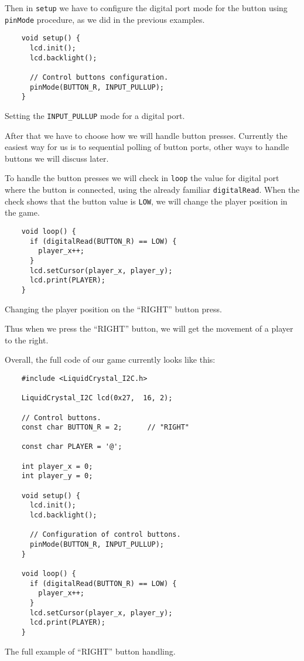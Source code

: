 \documentclass[../sparc.tex]{subfiles}
\begin{document}
Then in \texttt{setup} we have to configure the digital port mode for
the button using \texttt{pinMode} procedure, as we did in the previous
examples.

\begin{listing}[H]
  \begin{verbatim}
    void setup() {
      lcd.init();
      lcd.backlight();

      // Control buttons configuration.
      pinMode(BUTTON_R, INPUT_PULLUP);
    }
  \end{verbatim}
  \caption{Setting the \texttt{INPUT_PULLUP} mode for a digital port.}
  \label{listing:game-dev-input-pullup-mode}
\end{listing}

After that we have to choose how we will handle button presses.  Currently the
easiest way for us is to sequential polling of button ports, other ways to
handle buttons we will discuss later.

To handle the button presses we will check in \texttt{loop} the value
for digital port where the button is connected, using the already familiar
\texttt{digitalRead}.  When the check shows that the button value is
\texttt{LOW}, we will change the player position in the game.

\begin{listing}[H]
  \begin{verbatim}
    void loop() {
      if (digitalRead(BUTTON_R) == LOW) {
        player_x++;
      }
      lcd.setCursor(player_x, player_y);
      lcd.print(PLAYER);
    }
  \end{verbatim}
  \caption{Changing the player position on the ``RIGHT'' button press.}
  \label{listing:game-dev-button-right}
\end{listing}

Thus when we press the ``RIGHT'' button, we will get the movement of a player to
the right.

Overall, the full code of our game currently looks like this:

\begin{listing}[H]
  \begin{verbatim}
    #include <LiquidCrystal_I2C.h>

    LiquidCrystal_I2C lcd(0x27,  16, 2);

    // Control buttons.
    const char BUTTON_R = 2;      // "RIGHT"

    const char PLAYER = '@';

    int player_x = 0;
    int player_y = 0;

    void setup() {
      lcd.init();
      lcd.backlight();

      // Configuration of control buttons.
      pinMode(BUTTON_R, INPUT_PULLUP);
    }

    void loop() {
      if (digitalRead(BUTTON_R) == LOW) {
        player_x++;
      }
      lcd.setCursor(player_x, player_y);
      lcd.print(PLAYER);
    }
  \end{verbatim}
  \caption{The full example of ``RIGHT'' button handling.}
  \label{listing:game-dev-button-right-full-example}
\end{listing}
\end{document}
